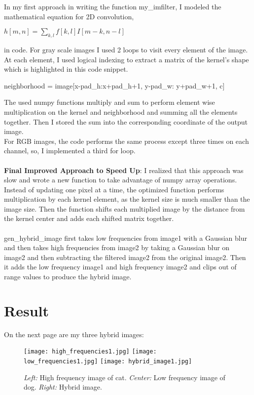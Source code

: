 In my first approach in writing the function my\_imfilter, I modeled the mathematical equation for 2D convolution,
\begin{center}
$h[m, n] = \sum_{k,l} f[k,l]I[m-k, n-l]$
\end{center}
in code. For gray scale images I used 2 loops to visit every element of the image. At each element, I used logical indexing to extract a matrix of the kernel's shape which is highlighted in this code snippet.
\begin{python}
neighborhood = image[x-pad_h:x+pad_h+1, y-pad_w: y+pad_w+1, c]
\end{python}
The used numpy functions multiply and sum to perform element wise multiplication on the kernel and neighborhood and summing all the elements together. Then I stored the sum into the corresponding coordinate of the output image.\\
For RGB images, the code performs the same process except three times on each channel, so, I implemented a third for loop. \\\\
\textbf{Final Improved Approach to Speed Up}: I realized that this approach was slow and wrote a new function to take advantage of numpy array operations. Instead of updating one pixel at a time, the optimized function performs multiplication by each kernel element, as the kernel size is much smaller than the image size. Then the function shifts each multiplied image by the distance from the kernel center and adds each shifted matrix together.
\\\\
gen\_hybrid\_image first takes low frequencies from image1 with a Gaussian blur and then takes high frequencies from image2 by taking a Gaussian blur on image2 and then subtracting the filtered image2 from the original image2. Then it adds the low frequency image1 and high frequency image2 and clips out of range values to produce the hybrid image.

\section*{Result}
On the next page are my three hybrid images:

\begin{figure} [h]
    \centering
    \texttt{[image: high\_frequencies1.jpg]}
    \texttt{[image: low\_frequencies1.jpg]}
    \texttt{[image: hybrid\_image1.jpg]}
    \caption{\emph{Left:} High frequency image of cat. \emph{Center:} Low frequency image of dog. \emph{Right:} Hybrid image.}
\end{figure}

